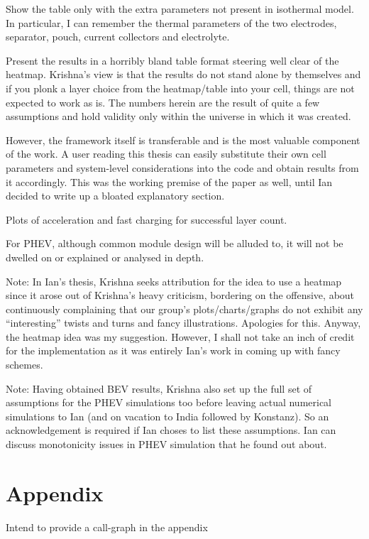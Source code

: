 Show the table  only with the extra parameters not  present in isothermal model.
In particular,  I can  remember the  thermal parameters  of the  two electrodes,
separator, pouch, current collectors and electrolyte.

Present the results in a horribly bland  table format steering well clear of the
heatmap. Krishna's view is that the results do not stand alone by themselves and
if you plonk  a layer choice from  the heatmap/table into your  cell, things are
not expected  to work as is.  The numbers herein are  the result of quite  a few
assumptions and hold validity only within the universe in which it was created.

However, the framework itself is transferable and is the most valuable component
of the  work. A user  reading this thesis can  easily substitute their  own cell
parameters and system-level considerations into the code and obtain results from
it accordingly.  This was the  working premise of the  paper as well,  until Ian
decided to write up a bloated explanatory section.

Plots of acceleration and fast charging for successful layer count.

For PHEV, although common module design will be alluded to, it will not be dwelled on or explained or analysed in depth.


Note: In Ian's thesis,  Krishna seeks attribution for the idea  to use a heatmap
since it  arose out of  Krishna's heavy  criticism, bordering on  the offensive,
about  continuously  complaining that  our  group's  plots/charts/graphs do  not
exhibit any ``interesting'' twists and  turns and fancy illustrations. Apologies
for this. Anyway, the heatmap idea was  my suggestion. However, I shall not take
an inch of credit for the implementation as it was entirely Ian's work in coming
up with fancy schemes.

Note:  Having  obtained  BEV results,  Krishna  also  set  up  the full  set  of
assumptions  for  the  PHEV  simulations too  before  leaving  actual  numerical
simulations  to Ian  (and on  vacation  to India  followed by  Konstanz). So  an
acknowledgement is  required if Ian  choses to  list these assumptions.  Ian can
discuss monotonicity issues in PHEV simulation that he found out about.

\section{Appendix}
Intend to provide a call-graph in the appendix


